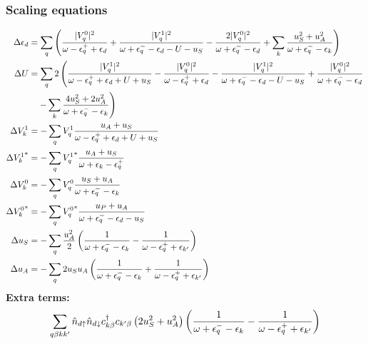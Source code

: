\documentclass[14pt]{extarticle}
\numberwithin{equation}{section}
\begin{document}
\subsubsection{Scaling equations}
\begin{equation}\begin{aligned}
	\Delta \epsilon_d &= \sum_q \left({\frac{|V_q^0|^2}{\omega - \epsilon_q^+ + \epsilon_d } + \frac{|V_q^1|^2}{\omega + \epsilon^-_q - \epsilon_d  - U - u_S} - \frac{2|V_q^0|^2}{\omega + \epsilon^-_q - \epsilon_d} + \sum_k\frac{u_S^2 + u_A^2}{\omega + \epsilon_q^- - \epsilon_k}}\right)\\
	\Delta U &= \sum_q 2\left(\frac{|V_q^1|^2}{\omega - \epsilon_q^+ + \epsilon_d + U + u_S} - \frac{|V_q^0|^2}{\omega - \epsilon_q^+ + \epsilon_d} - \frac{|V_q^1|^2}{\omega + \epsilon^-_q - \epsilon_d  - U - u_S} +\frac{|V_q^0|^2}{\omega + \epsilon^-_q - \epsilon_d} \right.\\
		 &\quad\left.-\sum_k \frac{4u_S^2 + 2u_A^2}{\omega + \epsilon_q^- - \epsilon_k}\right)\\
\Delta V_k^1 &=-\sum_q V_q^1\frac{u_A + u_S}{\omega - \epsilon_q^+ + \epsilon_d + U + u_S} \\
\Delta {V_k^1}^* &= -\sum_q  {V_q^1}^*\frac{u_A + u_S}{\omega + \epsilon_k - \epsilon_q^+}\\
\Delta V_k^0 &= -\sum_q V_q^0\frac{u_S + u_A}{\omega + \epsilon_q^- - \epsilon_{k}}\\
\Delta {V_k^0}^* &=-\sum_q {V_q^0}^* \frac{u_P + u_A}{\omega + \epsilon_q^- - \epsilon_d - u_S}\\
\Delta u_S &= -\sum_q\frac{u_A^2}{2}\left({\frac{1}{\omega + \epsilon_q^-  - \epsilon_{k}} - \frac{1}{\omega - \epsilon_q^+  + \epsilon_{k^\prime}}}\right)\\
\Delta u_A &= - \sum_q 2u_S u_A \left({\frac{1}{\omega + \epsilon_q^-  - \epsilon_{k}} + \frac{1}{\omega - \epsilon_q^+  + \epsilon_{k^\prime}}}\right)\\
\end{aligned}\end{equation}
\textbf{Extra terms:}
\begin{gather*}
	\sum_{q\beta k k^\prime}\hat n_{d\uparrow}\hat n_{d\downarrow}c^\dagger_{k\beta}c_{k^\prime\beta}\left({2u_S^2 + u_A^2}\right)\left({\frac{1}{\omega + \epsilon_q^- - \epsilon_{k}} - \frac{1}{\omega - \epsilon_q^+ + \epsilon_{k^\prime}}}\right)
\end{gather*}
\end{document}
